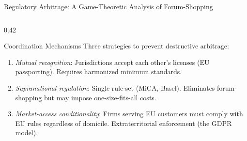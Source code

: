 \begin{frame}{Regulatory Arbitrage: A Game-Theoretic Analysis of Forum-Shopping}
\begin{columns}[T]
\begin{column}{0.42\textwidth}
\begin{itemize}
      \end{itemize}
      \vspace{0.3em}
      \begin{block}{Coordination Mechanisms}
        Three strategies to prevent destructive arbitrage:
        \begin{enumerate}\small
          \item \textit{Mutual recognition}: Jurisdictions accept each other's licenses (EU passporting). Requires harmonized minimum standards.
          \item \textit{Supranational regulation}: Single rule-set (MiCA, Basel). Eliminates forum-shopping but may impose one-size-fits-all costs.
          \item \textit{Market-access conditionality}: Firms serving EU customers must comply with EU rules regardless of domicile. Extraterritorial enforcement (the GDPR model).
        \end{enumerate}
      \end{block}
    \end{column}
  \end{columns}
\end{frame}


